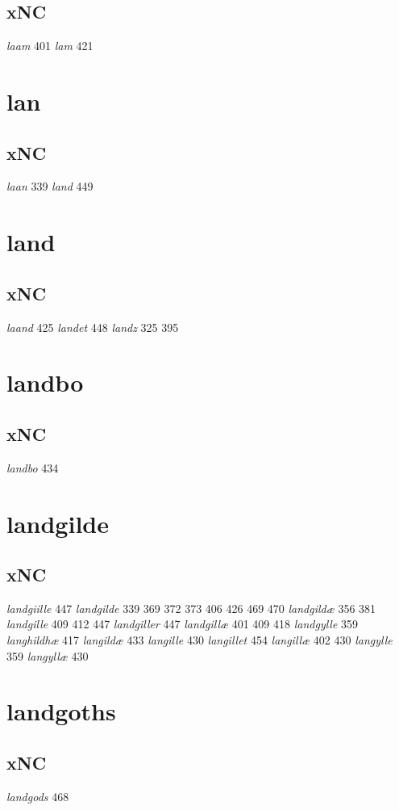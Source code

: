 \documentclass[a4paper,twocolumn]{article}
\begin{document}
\subsection{xNC}
\label{sec:org1684c64}
\emph{laam} 401 \emph{lam} 421 
\section{lan}
\label{sec:org32034bc}
\subsection{xNC}
\label{sec:orgf8bc372}
\emph{laan} 339 \emph{land} 449 
\section{land}
\label{sec:orgb41d9e7}
\subsection{xNC}
\label{sec:org028ebaa}
\emph{laand} 425 \emph{landet} 448 \emph{landz} 325 395 
\section{landbo}
\label{sec:orga06cd68}
\subsection{xNC}
\label{sec:orgb0dc698}
\emph{landbo} 434 
\section{landgilde}
\label{sec:orgee2e7e7}
\subsection{xNC}
\label{sec:org754cb1a}
\emph{landgiille} 447 \emph{landgilde} 339 369 372 373 406 426 469 470 \emph{landgildæ} 356 381 \emph{landgille} 409 412 447 \emph{landgiller} 447 \emph{landgillæ} 401 409 418 \emph{landgylle} 359 \emph{langhildhæ} 417 \emph{langildæ} 433 \emph{langille} 430 \emph{langillet} 454 \emph{langillæ} 402 430 \emph{langylle} 359 \emph{langyllæ} 430 
\section{landgoths}
\label{sec:orgc105037}
\subsection{xNC}
\label{sec:org7f46430}
\emph{landgods} 468 
\end{document}
